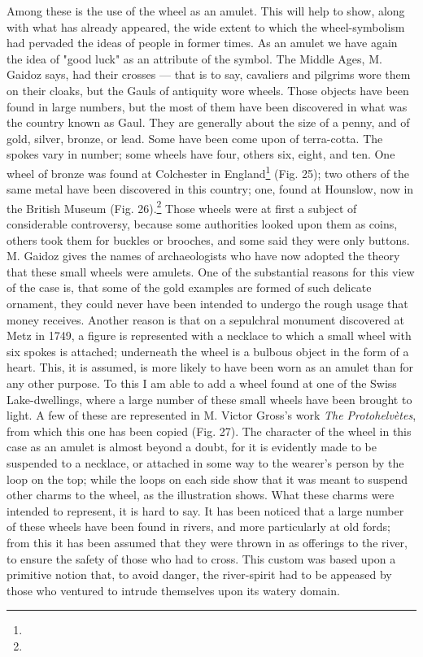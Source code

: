 \documentclass[a4paper, 11pt, oneside, polutonikogreek, english]{article}
\begin{document}
Among these is the use of the wheel as an amulet. This will help to show, along with what has already appeared, the wide extent to which the wheel-symbolism had pervaded the ideas of people in former times. As an amulet we have again the idea of "good luck" as an attribute of the symbol. The Middle Ages, M. Gaidoz says, had their crosses --- that is to say, cavaliers and pilgrims wore them on their cloaks, but the Gauls of antiquity wore wheels. Those objects have been found in large numbers, but the most of them have been discovered in what was the country known as Gaul. They are generally about the size of a penny, and of gold, silver, bronze, or lead. Some have been come upon of terra-cotta. The spokes vary in number; some wheels have four, others six, eight, and ten. One wheel of bronze was found at Colchester in England\footnote{} (Fig. 25); two others of the same metal have been discovered in this country; one, found at Hounslow, now in the British Museum (Fig. 26).\footnote{} Those wheels were at first a subject of considerable controversy, because some authorities looked upon them as coins, others took them for buckles or brooches, and some said they were only buttons. M. Gaidoz gives the names of archaeologists who have now adopted the theory that these small wheels were amulets. One of the substantial reasons for this view of the case is, that some of the gold examples are formed of such delicate ornament, they could never have been intended to undergo the rough usage that money receives. Another reason is that on a sepulchral monument discovered at Metz in 1749, a figure is represented with a necklace to which a small wheel with six spokes is attached; underneath the wheel is a bulbous object in the form of a heart. This, it is assumed, is more likely to have been worn as an amulet than for any other purpose. To this I am able to add a wheel found at one of the Swiss Lake-dwellings, where a large number of these small wheels have been brought to light. A few of these are represented in M. Victor Gross's work \emph{The Protohelvètes}, from which this one has been copied (Fig. 27). The character of the wheel in this case as an amulet is almost beyond a doubt, for it is evidently made to be suspended to a necklace, or attached in some way to the wearer's person by the loop on the top; while the loops on each side show that it was meant to suspend other charms to the wheel, as the illustration shows. What these charms were intended to represent, it is hard to say. It has been noticed that a large number of these wheels have been found in rivers, and more particularly at old fords; from this it has been assumed that they were thrown in as offerings to the river, to ensure the safety of those who had to cross. This custom was based upon a primitive notion that, to avoid danger, the river-spirit had to be appeased by those who ventured to intrude themselves upon its watery domain.
\end{document}
